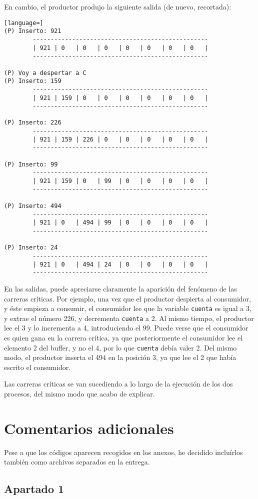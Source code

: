 \documentclass[a4paper]{article}
\begin{document}
En cambio, el productor produjo la siguiente salida (de nuevo, recortada):

\begin{lstlisting}[language=]
(P) Inserto: 921
        -------------------------------------------------
        | 921 | 0   | 0   | 0   | 0   | 0   | 0   | 0   |
        -------------------------------------------------

(P) Voy a despertar a C
(P) Inserto: 159
        -------------------------------------------------
        | 921 | 159 | 0   | 0   | 0   | 0   | 0   | 0   |
        -------------------------------------------------

(P) Inserto: 226
        -------------------------------------------------
        | 921 | 159 | 226 | 0   | 0   | 0   | 0   | 0   |
        -------------------------------------------------

(P) Inserto: 99
        -------------------------------------------------
        | 921 | 159 | 0   | 99  | 0   | 0   | 0   | 0   |
        -------------------------------------------------

(P) Inserto: 494
        -------------------------------------------------
        | 921 | 0   | 494 | 99  | 0   | 0   | 0   | 0   |
        -------------------------------------------------

(P) Inserto: 24
        -------------------------------------------------
        | 921 | 0   | 494 | 24  | 0   | 0   | 0   | 0   |
        -------------------------------------------------
\end{lstlisting}

En las salidas, puede apreciarse claramente la aparición del fenómeno de las carreras críticas. Por ejemplo, una vez que el productor despierta al consumidor, y éste empieza a consumir, el consumidor lee que la variable \texttt{cuenta} es igual a 3, y extrae el número 226, y decrementa \texttt{cuenta} a 2. Al mismo tiempo, el productor lee el 3 y lo incrementa a 4, introduciendo el 99. Puede verse que el consumidor es quien gana en la carrera crítica, ya que posteriormente el consumidor lee el elemento 2 del buffer, y no el 4, por lo que \texttt{cuenta} debía valer 2. Del mismo modo, el productor inserta el 494 en la posición 3, ya que lee el 2 que había escrito el consumidor.

Las carreras críticas se van sucediendo a lo largo de la ejecución de los dos procesos, del mismo modo que acabo de explicar.
    
\section{Comentarios adicionales}

Pese a que los códigos aparecen recogidos en los anexos, he decidido incluírlos también como archivos separados en la entrega.
    
\begin{appendices} 
\section{\LARGE \textbf{Apartado 1}}\label{anexo1}

    
\end{appendices}
\end{document}
